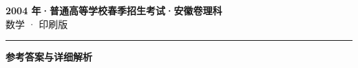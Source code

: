 \documentclass[zihao=5, a4paper]{ctexart}
\begin{document}
\begin{center}
  {\Large\bfseries 2004 年·普通高等学校春季招生考试·安徽卷理科}\\[4pt]
  {\large 数学 · 印刷版}
\end{center}
\medskip
{}

\par\bigskip\hrule\bigskip
{}
\begin{center}{\large\bfseries 参考答案与详细解析}\end{center}
\smallskip

\end{document}
